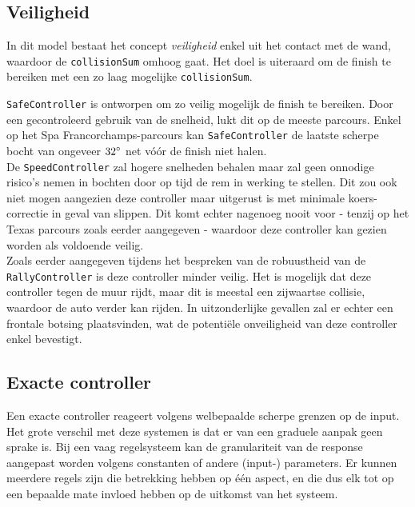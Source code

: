 \documentclass[10pt,a4paper]{article}
\begin{document}
		\subsection{Veiligheid}
			In dit model bestaat het concept \textit{veiligheid} enkel uit het contact met de wand, waardoor de \texttt{collisionSum} omhoog gaat. Het doel is uiteraard om de finish te bereiken met een zo laag mogelijke \texttt{collisionSum}.

			\texttt{SafeController} is ontworpen om zo veilig mogelijk de finish te bereiken. Door een gecontroleerd gebruik van de snelheid, lukt dit op de meeste parcours. Enkel op het Spa Francorchamps-parcours kan \texttt{SafeController} de laatste scherpe bocht van ongeveer $32 \degree$ net v\'o\'or de finish niet halen.\\

			De \texttt{SpeedController} zal hogere snelheden behalen maar zal geen onnodige risico's nemen in bochten door op tijd de rem in werking te stellen. Dit zou ook niet mogen aangezien deze controller maar uitgerust is met minimale koers-correctie in geval van slippen. Dit komt echter nagenoeg nooit voor - tenzij op het Texas parcours zoals eerder aangegeven - waardoor deze controller kan gezien worden als voldoende veilig.\\

			Zoals eerder aangegeven tijdens het bespreken van de robuustheid van de \texttt{RallyController} is deze controller minder veilig. Het is mogelijk dat deze controller tegen de muur rijdt, maar dit is meestal een zijwaartse collisie, waardoor de auto verder kan rijden. In uitzonderlijke gevallen zal er echter een frontale botsing plaatsvinden, wat de potenti\"ele onveiligheid van deze controller enkel bevestigt.\\

		\subsection{Exacte controller}
			Een exacte controller reageert volgens welbepaalde scherpe grenzen op de input. Het grote verschil met deze systemen is dat er van een graduele aanpak geen sprake is. Bij een vaag regelsysteem kan de granulariteit van de response aangepast worden volgens constanten of andere (input-) parameters. Er kunnen meerdere regels zijn die betrekking hebben op \'e\'en aspect, en die dus elk tot op een bepaalde mate invloed hebben op de uitkomst van het systeem. \\
\end{document}
